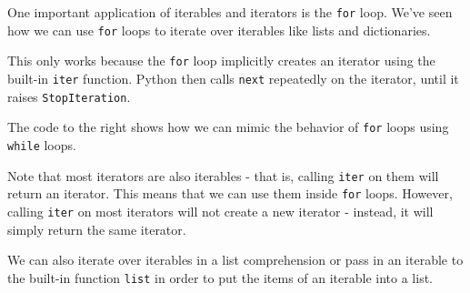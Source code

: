 One important application of iterables 
and iterators is the \lstinline$for$ loop.
We've seen how we can use \lstinline$for$ loops to iterate over iterables like lists and 
dictionaries.

This only works because the \lstinline$for$ loop implicitly creates an iterator
using the built-in \lstinline$iter$ function.
Python then calls \lstinline$next$ repeatedly on the iterator, until it raises
\lstinline$StopIteration$.

The code to the right shows how we can mimic the behavior of \lstinline$for$ loops
using \lstinline$while$ loops.

Note that most iterators are also iterables - that is, calling \lstinline$iter$ on 
them will return an iterator. This means that we can use them inside \lstinline$for$ loops. 
However, calling \lstinline$iter$ on most iterators will not create a new iterator -
instead, it will simply return the same iterator.

We can also iterate over iterables in a list comprehension or pass in an iterable to
the built-in function \lstinline$list$ in order to put the items of an iterable into
a list.

